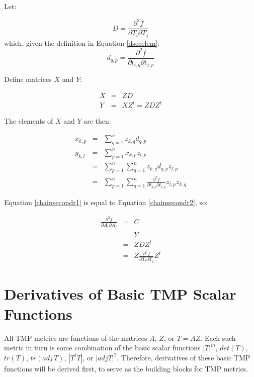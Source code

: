 \documentclass{report}
\begin{document}
\noindent Let:

\begin{equation}
D = \frac{\partial^2 f}{\partial T_i \partial T_j}
\end{equation}
which, given the definition in Equation \ref{dsecelem}:
\begin{equation}
d_{q,p} = \frac{\partial^2 f}{\partial t_{i,q} \partial t_{j,p}}
\end{equation}

\noindent Define matrices $X$ and $Y$:

\begin{eqnarray}
X &=& Z D \\
Y &=& X Z^t = Z D Z^t
\end{eqnarray}

\noindent The elements of $X$ and $Y$ are then:

\begin{eqnarray}
x_{k,p} & = & \sum_{q=1}^n z_{k,q} d_{q,p} \\
y_{k,l} & = & \sum_{p=1}^n x_{k,p} z_{l,p} \\ 
        & = & \sum_{p=1}^n \sum_{q=1}^n z_{k,q} d_{q,p} z_{l,p} \\
\label{chainsecondr2}
        & = & \sum_{p=1}^n \sum_{q=1}^n \frac{\partial^2 f}{\partial t_{j,p} \partial t_{i,q}} z_{l,p} z_{k,q}
\end{eqnarray}

\noindent Equation \ref{chainsecondr1} is equal to Equation \ref{chainsecondr2}, so:

\begin{eqnarray}
\frac{\partial^2 f}{\partial A_i \partial A_j} &=& C \\
&=& Y \\
&=& Z D Z^t \\
&=& Z \frac{\partial^2 f}{\partial T_i \partial T_j} Z^t 
\end{eqnarray}


\section{Derivatives of Basic TMP Scalar Functions}
All TMP metrics are functions of the matrices $A$, $Z$, or $T=AZ$.
Each such metric in turn is some combination of the basic scalar functions
$|T|^m$, $det(T)$, $tr(T)$, $tr(adj \, T)$, $|T^t T|$, or $|adj T|^2$.  
Therefore, derivatives of these basic TMP functions will be derived first,
to serve as the building blocks for TMP metrics.  \newline
\end{document}
